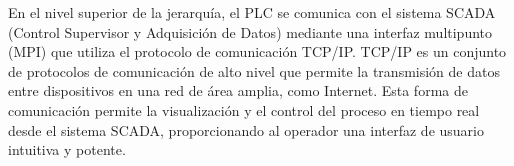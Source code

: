 En el nivel superior de la jerarquía, el PLC se comunica con el sistema SCADA (Control Supervisor y Adquisición de Datos) mediante una interfaz multipunto (MPI) que utiliza el protocolo de comunicación TCP/IP. TCP/IP es un conjunto de protocolos de comunicación de alto nivel que permite la transmisión de datos entre dispositivos en una red de área amplia, como Internet. Esta forma de comunicación permite la visualización y el control del proceso en tiempo real desde el sistema SCADA, proporcionando al operador una interfaz de usuario intuitiva y potente.

